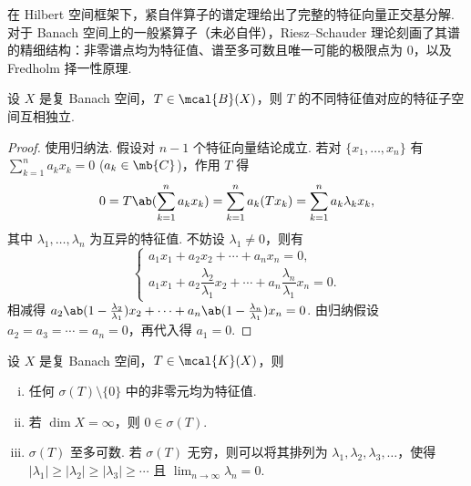 在 Hilbert 空间框架下，紧自伴算子的谱定理给出了完整的特征向量正交基分解. 对于 Banach 空间上的一般紧算子（未必自伴），Riesz--Schauder 理论刻画了其谱的精细结构：非零谱点均为特征值、谱至多可数且唯一可能的极限点为 $0$，以及 Fredholm 择一性原理.

\begin{proposition}[特征子空间的独立性]\label{prop:eigenspace-independence}
设 $X$ 是复 Banach 空间，$T \in \mcal{B}(X)$，则 $T$ 的不同特征值对应的特征子空间互相独立.
\end{proposition}

\begin{proof}
使用归纳法. 假设对 $n-1$ 个特征向量结论成立. 若对 $\{x_1,\dots,x_n\}$ 有 $\sum_{k=1}^n a_k x_k = 0$ ($a_k \in \mb{C}$)，作用 $T$ 得
\begin{equation*}
0 = T\ab(\sum_{k=1}^n a_k x_k) = \sum_{k=1}^n a_k (Tx_k) = \sum_{k=1}^n a_k \lambda_k x_k,
\end{equation*}
其中 $\lambda_1,\dots,\lambda_n$ 为互异的特征值. 不妨设 $\lambda_1 \neq 0$，则有
\begin{equation*}
\begin{cases}
a_1 x_1 + a_2 x_2 + \cdots + a_n x_n = 0,\\[2pt]
a_1 x_1 + a_2 \dfrac{\lambda_2}{\lambda_1} x_2 + \cdots + a_n \dfrac{\lambda_n}{\lambda_1} x_n = 0.
\end{cases}
\end{equation*}
相减得 $a_2\ab(1-\frac{\lambda_2}{\lambda_1})x_2 + \cdots + a_n\ab(1-\frac{\lambda_n}{\lambda_1})x_n = 0$. 由归纳假设 $a_2 = a_3 = \cdots = a_n = 0$，再代入得 $a_1 = 0$.
\end{proof}

\begin{theorem}[紧算子的谱]\label{thm:compact-spectrum}
设 $X$ 是复 Banach 空间，$T \in \mcal{K}(X)$，则
\begin{enumerate}[(i)]
    \item 任何 $\sigma(T)\setminus\{0\}$ 中的非零元均为特征值.
    \item 若 $\dim X = \infty$，则 $0 \in \sigma(T)$.
    \item $\sigma(T)$ 至多可数. 若 $\sigma(T)$ 无穷，则可以将其排列为 $\lambda_1, \lambda_2, \lambda_3, \dots$，使得 $|\lambda_1| \geq |\lambda_2| \geq |\lambda_3| \geq \cdots$ 且 $\lim_{n \to \infty} \lambda_n = 0$.
\end{enumerate}
\end{theorem}

